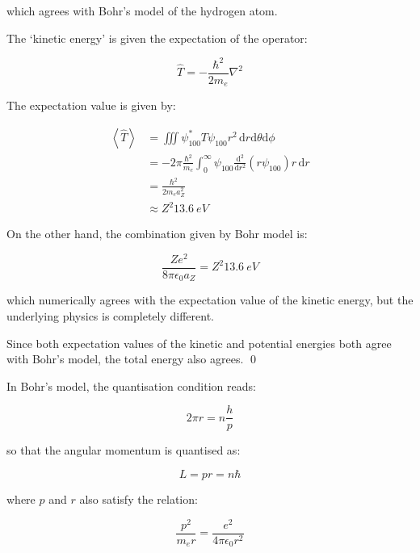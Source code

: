 \documentclass[12pt]{article}
\begin{document}
which agrees with Bohr's model of the hydrogen atom.

The `kinetic energy' is given the expectation of the operator:

\begin{equation}
    \hat{T} = - \frac{\hbar^{2}}{2m_{e}} \nabla^{2}
\end{equation}

The expectation value is given by:

\begin{equation}
    \begin{split}
        \left\langle \hat{T} \right\rangle &= \iiint \psi_{100}^{*} T \psi_{100} r^{2} \, \mathrm{d}r \mathrm{d}\theta \mathrm{d}\phi \\
        &= - 2\pi \frac{\hbar^{2}}{m_{e}} \int_{0}^{\infty} \psi_{100} \frac{\mathrm{d}^{2}}{\mathrm{d}r^{2}} \left( r\psi_{100} \right) r \, \mathrm{d}r \\
        &= \frac{\hbar^{2}}{2m_{e} a_{Z}^{2}} \\
        &\approx Z^{2} \qty{13.6}{eV}
    \end{split}
\end{equation}

On the other hand, the combination given by Bohr model is:

\begin{equation}
    \frac{Ze^{2}}{8 \pi \epsilon_{0} a_{Z}} = Z^{2} \qty{13.6}{eV}
\end{equation}

which numerically agrees with the expectation value of the kinetic energy, but the underlying physics is completely different.

Since both expectation values of the kinetic and potential energies both agree with Bohr's model, the total energy also agrees.
\qed


In Bohr's model, the quantisation condition reads:

\begin{equation}
    2 \pi r = n \frac{h}{p}
\end{equation}

so that the angular momentum is quantised as:

\begin{equation}
    L = pr = n \hbar
\end{equation}

where $p$ and $r$ also satisfy the relation:

\begin{equation}
    \frac{p^{2}}{m_{e}r} = \frac{e^{2}}{4 \pi \epsilon_{0} r^{2}}
\end{equation}
\end{document}
